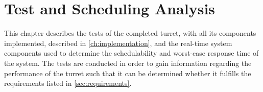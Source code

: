 \chapter{Test and Scheduling Analysis}\label{ch:test}
This chapter describes the tests of the completed turret, with all its components implemented, described in \cref{ch:implementation}, and the real-time system components used to determine the schedulability and worst-case response time of the system. The tests are conducted in order to gain information regarding the performance of the turret such that it can be determined whether it fulfills the requirements listed in \cref{sec:requirements}. 



